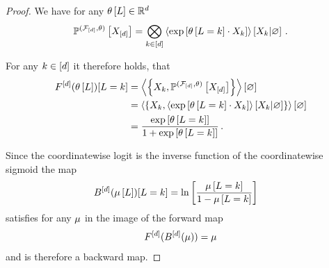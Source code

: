 \begin{proof}
	We have for any $\theta\left[L\right]\in\mathbb{R}^{d}$
		\[ \mathbb{P}^{(\mathcal{F}_{[d]},\theta)}\left[X_{[d]}\right] 
		= \bigotimes_{k\in[d]} \left\langle \mathrm{exp}\left[\theta\left[L=k\right]\cdot X_{k}\right]\right\rangle \left[ X_{k} | \varnothing \right]  \, . \]

	
	For any $k\in[d]$ it therefore holds, that
	\begin{align*}
		F^{[d]}(\theta\left[L\right])[L=k] 
		&=\left\langle \left\{X_{k},  \mathbb{P}^{(\mathcal{F}_{[d]},\theta)}\left[X_{[d]}\right]\right\}\right\rangle \left[ \varnothing \right] \\
		&=\left\langle \left\{X_{k},  \left\langle \mathrm{exp}\left[\theta\left[L=k\right]\cdot X_{k}\right]\right\rangle \left[ X_{k} | \varnothing \right]\right\}\right\rangle \left[ \varnothing \right] \\
		& = \frac{\mathrm{exp}\left[\theta\left[L=k\right]\right]}{1+\mathrm{exp}\left[\theta\left[L=k\right]\right]} \, .
	\end{align*}
	
	Since the coordinatewise logit is the inverse function of the coordinatewise sigmoid the map
	\begin{align*}
		B^{[d]}(\mu\left[L\right])[L=k] 
		& = \ln \left[ \frac{\mu\left[L=k\right]}{1- \mu\left[L=k\right]} \right]
	\end{align*}
	satisfies for any $\mu$ in the image of the forward map
	\begin{align*}
		F^{[d]}(B^{[d]}(\mu)) = \mu 
	\end{align*}
	and is therefore a backward map.
\end{proof}


